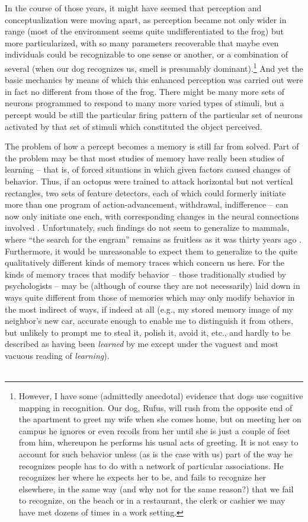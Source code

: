 In the course of those years, it might have seemed that perception and conceptualization were moving apart, as perception became not only wider in range (most of the environment seems quite undifferentiated to the frog) but more particularized, with so many parameters recoverable that maybe even individuals could be recognizable to one sense or another, or a combination of several (when our dog recognizes us, smell is presumably dominant).\footnote{However, I have some (admittedly anecdotal) evidence that dogs use cognitive mapping in recognition. Our dog, Rufus, will rush from the opposite end of the apartment to greet my wife when she comes home, but on meeting her on campus he ignores or even recoils from her until she is just a couple of feet from him, whereupon he performs his usual acts of greeting. It is not easy to account for such behavior unless (as is the case with us) part of the way he recognizes people has to do with a network of particular associations. He recognizes her where he expects her to be, and fails to recognize her elsewhere, in the same way (and why not for the same reason?) that we fail to recognize, on the beach or in a restaurant, the clerk or cashier we may have met dozens of times in a work setting.} And yet the basic mechanics by means of which this enhanced perception was carried out were in fact no different from those of the frog. There might be many more sets of neurons programmed to respond to many more varied types of stimuli, but a percept would be still the particular firing pattern of the particular set of neurons activated by that set of stimuli which constituted the object perceived.

The problem of how a percept becomes a memory is still far from solved. Part of the problem may be that most studies of memory have really been studies of learning -- that is, of forced situations in which given factors caused changes of behavior. Thus, if an octopus were trained to attack horizontal but not vertical rectangles, two sets of feature detectors, each of which could formerly initiate more than one program of action-advancement, withdrawal, indifference -- can now only initiate one each, with corresponding changes in the neural connections involved \citep{Bradley1975}. Unfortunately, such findings do not seem to generalize to mammals, where ``the search for the engram'' remains as fruitless as it was thirty years ago \citep{Lashley1950}. Furthermore, it would be unreasonable to expect them to generalize to the quite qualitatively different kinds of memory traces which concern us here. For the kinds of memory traces that modify behavior -- those traditionally studied by psychologists -- may be (although of course they are not necessarily) laid down in ways quite different from those of memories which may only modify behavior in the most indirect of ways, if indeed at all (e.g., my stored memory image of my neighbor's new car, accurate enough to enable me to distinguish it from others, but unlikely to prompt me to steal it, polish it, avoid it, etc., and hardly to be described as having been \textit{learned} by me except under the vaguest and most vacuous reading of \textit{learning}).\\\\

